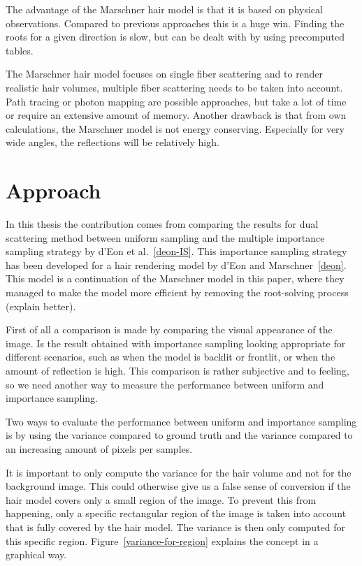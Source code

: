 \documentclass[11pt,a4paper]{report}
\begin{document}
The advantage of the Marschner hair model is that it is based on physical observations. Compared to previous approaches this is a huge win. Finding the roots for a given direction is slow, but can be dealt with by using precomputed tables.

The Marschner hair model focuses on single fiber scattering and to render realistic hair volumes, multiple fiber scattering needs to be taken into account. Path tracing or photon mapping are possible approaches, but take a lot of time or require an extensive amount of memory. Another drawback is that from own calculations, the Marschner model is not energy conserving. Especially for very wide angles, the reflections will be relatively high.

%
%




\chapter{Approach}

In this thesis the contribution comes from comparing the results for dual scattering method between uniform sampling and the multiple importance sampling strategy by d'Eon et al.~\ref{deon-IS}. This importance sampling strategy has been developed for a hair rendering model by d'Eon and Marschner~\ref{deon}. This model is a continuation of the Marschner model in this paper, where they managed to make the model more efficient by removing the root-solving process (explain better).

First of all a comparison is made by comparing the visual appearance of the image. Is the result obtained with importance sampling looking appropriate for different scenarios, such as when the model is backlit or frontlit, or when the amount of reflection is high. This comparison is rather subjective and to feeling, so we need another way to measure the performance between uniform and importance sampling.

Two ways to evaluate the performance between uniform and importance sampling is by using the variance compared to ground truth and the variance compared to an increasing amount of pixels per samples.

It is important to only compute the variance for the hair volume and not for the background image. This could otherwise give us a false sense of conversion if the hair model covers only a small region of the image. To prevent this from happening, only a specific rectangular region of the image is taken into account that is fully covered by the hair model. The variance is then only computed for this specific region. Figure~\ref{variance-for-region} explains the concept in a graphical way.
\end{document}
